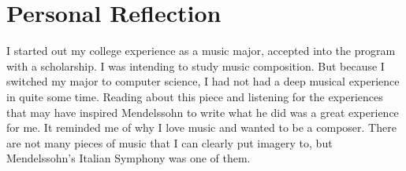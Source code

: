 \documentclass[onecolumn, 12pt]{article}
\begin{document}
\section*{Personal Reflection}

I started out my college experience as a music major, accepted into the program
with a scholarship.  I was intending to study music composition.  But because I
switched my major to computer science, I had not had a deep musical experience
in quite some time.  Reading about this piece and listening for the experiences
that may have inspired Mendelssohn to write what he did was a great experience
for me.  It reminded me of why I love music and wanted to be a composer.  There
are not many pieces of music that I can clearly put imagery to, but
Mendelssohn's Italian Symphony was one of them.
\end{document}
